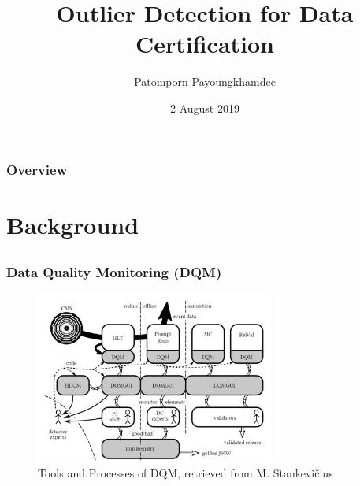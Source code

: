 \documentclass{beamer}
\title[Outlier Detection for DC]{Outlier Detection for Data Certification} %
\author{Patomporn Payoungkhamdee} %
\institute[MU] %
{
Mahidol University \\ %
\medskip
\textit{patomporn.pay@gmail.com} %
}
\date{2 August 2019} %
\begin{document}
\begin{frame}
\titlepage %
\end{frame}

\begin{frame}
\frametitle{Overview} %
\tableofcontents %
\end{frame}


\section{Background} %

\subsection{} %

\begin{frame}
\frametitle{Data Quality Monitoring (DQM)}

\begin{figure}
\includegraphics[height=0.7\textheight, width=0.7\textwidth]{images/dqm_flow}
\caption{Tools and Processes of DQM, retrieved from M. Stankevičius }
\end{figure}

\end{frame}
\end{document}
